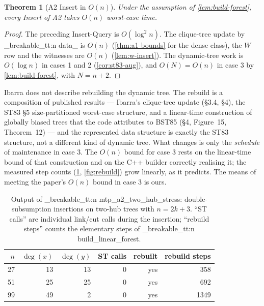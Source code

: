 \documentclass[11pt,a4paper,oneside]{report}
\theoremstyle{plain}
\newtheorem{theorem}{Theorem}[chapter]
\theoremstyle{definition}
\theoremstyle{remark}
\newcommand{\op}[1]{\textsf{#1}}
\DeclareRobustCommand{\code}[1]{\mtp_breakable_tt:n {#1}}
\begin{document}
\begin{theorem}[A2 \op{Insert} in \(O(n)\)]\label{thm:a2-insert}
Under the assumption of \cref{lem:build-forest}, every \op{Insert} of A2 takes \(O(n)\)
worst-case time.
\end{theorem}
\begin{proof}
The preceding \op{Insert-Query} is \(O(\log^2 n)\). The clique-tree update by \code{data_} is
\(O(n)\) (\cref{thm:a1-bounds} for the dense class), the \(W\) row and the witnesses are
\(O(n)\) (\cref{lem:w-insert}). The dynamic-tree work is \(O(\log n)\) in cases 1 and 2
(\cref{cor:st83-aug}), and \(O(N)=O(n)\) in case 3 by \cref{lem:build-forest}, with
\(N=n+2\).
\end{proof}

\begin{caution}
Ibarra does not describe rebuilding the dynamic tree. The rebuild is a composition of
published results --- Ibarra's clique-tree update (\S3.4, \S4), the ST83 \S5 size-partitioned
worst-case structure, and a linear-time construction of globally biased trees that the code
attributes to BST85 (\S4, Figure~15, Theorem~12) --- and the represented data structure is
exactly the ST83 structure, not a different kind of dynamic tree. What changes is only the
\emph{schedule} of maintenance in case 3. The \(O(n)\) bound for case 3 rests on the linear-time
bound of that construction and on the C++ builder correctly realising it; the measured step
counts (\cref{tab:two-hub}, \cref{fig:rebuild}) grow linearly, as it predicts. The means of
meeting the paper's \(O(n)\) bound in case 3 is ours.
\end{caution}

\begin{table}[ht]
\centering\small
\caption[Double-subsumption insertions in A2]{Output of \code{mtp_a2_two_hub_stress}:
double-subsumption insertions on two-hub trees with \(n=2k+3\). ``ST calls'' are individual
link/cut calls during the insertion; ``rebuild steps'' counts the elementary steps of
\code{build_linear_forest}.}\label{tab:two-hub}
\begin{tabular}{@{}rrrrrr@{}}
\toprule
\(n\) & \(\deg(x)\) & \(\deg(y)\) & ST calls & rebuilt & rebuild steps\\
\midrule
27 & 13 & 13 & 0 & yes & 358\\
51 & 25 & 25 & 0 & yes & 692\\
99 & 49 & 2 & 0 & yes & 1349\\
\bottomrule
\end{tabular}
\end{table}
\end{document}
